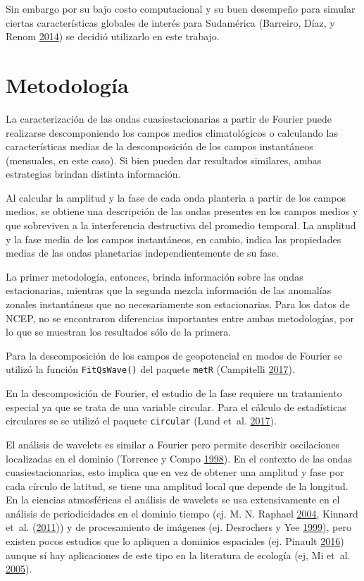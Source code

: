 \documentclass[spanish,a4paper,12p]{book}
\begin{document}
Sin embargo por su bajo costo computacional y su buen desempeño para
simular ciertas características globales de interés para Sudamérica
(Barreiro, Díaz, y Renom \protect\hyperlink{ref-Barreiro2014}{2014}) se
decidió utilizarlo en este trabajo.

\section{Metodología}\label{metodologia}

La caracterización de las ondas cuasiestacionarias a partir de Fourier
puede realizarse descomponiendo los campos medios climatológicos o
calculando las características medias de la descomposición de los campos
instantáneos (mensuales, en este caso). Si bien pueden dar resultados
similares, ambas estrategias brindan distinta información.

Al calcular la amplitud y la fase de cada onda planteria a partir de los
campos medios, se obtiene una descripción de las ondas presentes en los
campos medios y que sobreviven a la interferencia destructiva del
promedio temporal. La amplitud y la fase media de los campos
instantáneos, en cambio, indica las propiedades medias de las ondas
planetarias independientemente de su fase.

La primer metodología, entonces, brinda información sobre las ondas
estacionarias, mientras que la segunda mezcla información de las
anomalías zonales instantáneas que no necesariamente son estacionarias.
Para los datos de NCEP, no se encontraron diferencias importantes entre
ambas metodologías, por lo que se muestran los resultados sólo de la
primera.

Para la descomposición de los campos de geopotencial en modos de Fourier
se utilizó la función \texttt{FitQsWave()} del paquete \texttt{metR}
(Campitelli \protect\hyperlink{ref-R-metR}{2017}).

En la descomposición de Fourier, el estudio de la fase requiere un
tratamiento especial ya que se trata de una variable circular. Para el
cálculo de estadísticas circulares se se utilizó el paquete
\texttt{circular} (Lund et~al.
\protect\hyperlink{ref-R-circular}{2017}).

El análisis de wavelets es similar a Fourier pero permite describir
oscilaciones localizadas en el dominio (Torrence y Compo
\protect\hyperlink{ref-Torrence1998}{1998}). En el contexto de las ondas
cuasiestacionarias, esto implica que en vez de obtener una amplitud y
fase por cada círculo de latitud, se tiene una amplitud local que
depende de la longitud. En la ciencias atmosféricas el análisis de
wavelets se usa extensivamente en el análisis de periodicidades en el
dominio tiempo (ej. M. N. Raphael
\protect\hyperlink{ref-Raphael2004}{2004}, Kinnard et~al.
(\protect\hyperlink{ref-Kinnard2011}{2011})) y de procesamiento de
imágenes (ej. Desrochers y Yee
\protect\hyperlink{ref-Desrochers1999}{1999}), pero existen pocos
estudios que lo apliquen a dominios espaciales (ej. Pinault
\protect\hyperlink{ref-Pinault2016}{2016}) aunque sí hay aplicaciones de
este tipo en la literatura de ecología (ej, Mi et~al.
\protect\hyperlink{ref-Mi2005}{2005}).
\end{document}
